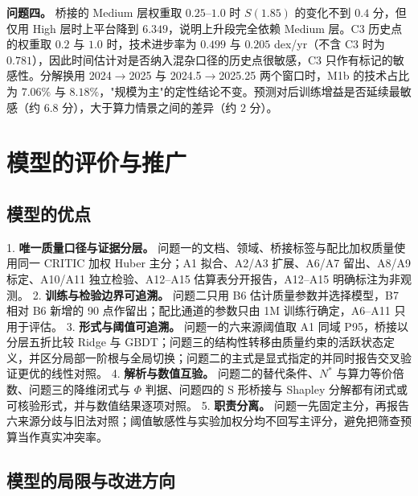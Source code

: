 \textbf{问题四。} 桥接的 Medium 层权重取 $0.25$–$1.0$ 时 $S(1.85)$ 的变化不到 $0.4$ 分，但仅用 High 层时上平台降到 $6.349$，说明上升段完全依赖 Medium 层。C3 历史点的权重取 $0.2$ 与 $1.0$ 时，技术进步率为 $0.499$ 与 $0.205$ dex/yr（不含 C3 时为 $0.781$），因此时间估计对是否纳入混杂口径的历史点很敏感，C3 只作有标记的敏感性。分解换用 2024$\to$2025 与 2024.5$\to$2025.25 两个窗口时，M1b 的技术占比为 $7.06\%$ 与 $8.18\%$，"规模为主"的定性结论不变。预测对后训练增益是否延续最敏感（约 6.8 分），大于算力情景之间的差异（约 2 分）。

\section{模型的评价与推广}
\label{sec:7}

\subsection{模型的优点}
\label{sec:7.1}

1. \textbf{唯一质量口径与证据分层。} 问题一的文档、领域、桥接标签与配比加权质量使用同一 CRITIC 加权 Huber 主分；A1 拟合、A2/A3 扩展、A6/A7 留出、A8/A9 标定、A10/A11 独立检验、A12–A15 估算表分开报告，A12–A15 明确标注为非观测。
2. \textbf{训练与检验边界可追溯。} 问题二只用 B6 估计质量参数并选择模型，B7 相对 B6 新增的 90 点作留出；配比通道的参数只由 1M 训练行确定，A6–A11 只用于评估。
3. \textbf{形式与阈值可追溯。} 问题一的六来源阈值取 A1 同域 P95，桥接以分层五折比较 Ridge 与 GBDT；问题三的结构性转移由质量约束的活跃状态定义，并区分局部一阶根与全局切换；问题二的主式是显式指定的并同时报告交叉验证更优的线性对照。
4. \textbf{解析与数值互验。} 问题二的替代条件、$N^*$ 与算力等价倍数、问题三的降维闭式与 $\Phi$ 判据、问题四的 S 形桥接与 Shapley 分解都有闭式或可核验形式，并与数值结果逐项对照。
5. \textbf{职责分离。} 问题一先固定主分，再报告六来源分歧与旧法对照；阈值敏感性与实验加权分均不回写主评分，避免把筛查预算当作真实冲突率。

\subsection{模型的局限与改进方向}
\label{sec:7.2}

